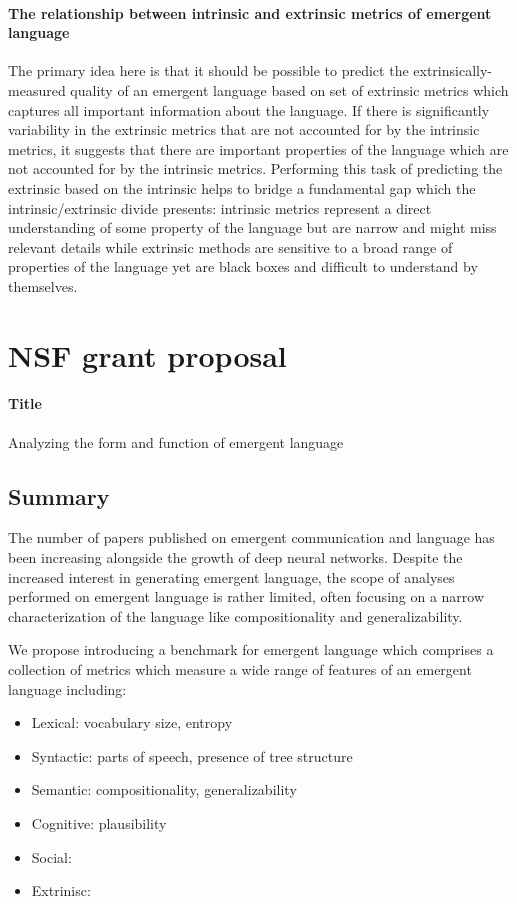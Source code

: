 \paragraph{The relationship between intrinsic and extrinsic metrics of emergent language}
The primary idea here is that it should be possible to predict the extrinsically-measured quality of an emergent language based on set of extrinsic metrics which captures all important information about the language.
If there is significantly variability in the extrinsic metrics that are not accounted for by the intrinsic metrics, it suggests that there are important properties of the language which are not accounted for by the intrinsic metrics.
Performing this task of predicting the extrinsic based on the intrinsic helps to bridge a fundamental gap which the intrinsic/extrinsic divide presents:
    intrinsic metrics represent a direct understanding of some property of the language but are narrow and might miss relevant details while extrinsic methods are sensitive to a broad range of properties of the language yet are black boxes and difficult to understand by themselves.


\section{NSF grant proposal}

\paragraph{Title}
Analyzing the form and function of emergent language

\subsection{Summary}
The number of papers published on emergent communication and language has been increasing alongside the growth of deep neural networks.
Despite the increased interest in generating emergent language, the scope of analyses performed on emergent language is rather limited, often focusing on a narrow characterization of the language like compositionality and generalizability.

We propose introducing a benchmark for emergent language which comprises a collection of metrics which measure a wide range of features of an emergent language including:
\begin{itemize}
    \item Lexical: vocabulary size, entropy
    \item Syntactic: parts of speech, presence of tree structure
    \item Semantic: compositionality, generalizability
    \item Cognitive: plausibility
    \item Social:
    \item Extrinisc:
\end{itemize}

